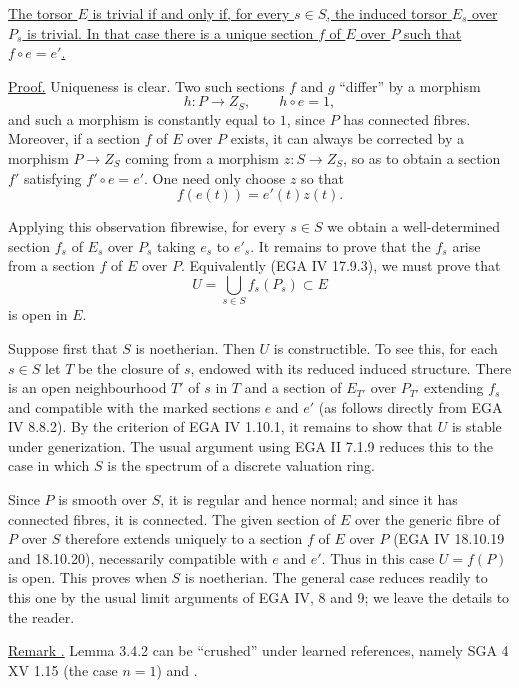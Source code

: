 \underline{The torsor $E$ is trivial if and only if, for every
$s\in S$, the induced torsor $E_s$ over $P_s$ is trivial.  In that
case there is a unique section $f$ of $E$ over $P$ such that
$f\circ e=e'$.}

\noindent\underline{Proof.}  Uniqueness is clear.  Two such sections
$f$ and $g$ ``differ'' by a morphism
\[
 h:P\longrightarrow Z_S,
 \qquad h\circ e=1,
\]
and such a morphism is constantly equal to $1$, since $P$ has
connected fibres.  Moreover, if a section $f$ of $E$ over $P$
exists, it can always be corrected by a morphism
$P\longrightarrow Z_S$ coming from a morphism $z:S\longrightarrow
Z_S$, so as to obtain a section $f'$ satisfying $f'\circ e=e'$.
One need only choose $z$ so that
\[
 f(e(t))=e'(t)z(t).
\]

Applying this observation fibrewise, for every $s\in S$ we obtain a
well-determined section $f_s$ of $E_s$ over $P_s$ taking $e_s$ to
$e'_s$.  It remains to prove that the $f_s$ arise from a section $f$
of $E$ over $P$.  Equivalently (EGA IV 17.9.3), we must prove that
\[
 U=\bigcup_{s\in S}f_s(P_s)\subset E
\]
is open in $E$.

Suppose first that $S$ is noetherian.  Then $U$ is constructible.  To
see this, for each $s\in S$ let $T$ be the closure of $s$, endowed
with its reduced induced structure.  There is an open neighbourhood
$T'$ of $s$ in $T$ and a section of $E_{T'}$ over $P_{T'}$ extending
$f_s$ and compatible with the marked sections $e$ and $e'$ (as
follows directly from EGA IV 8.8.2).  By the criterion of EGA IV
1.10.1, it remains to show that $U$ is stable under generization.
The usual argument using EGA II 7.1.9 reduces this to the case in
which $S$ is the spectrum of a discrete valuation ring.

Since $P$ is smooth over $S$, it is regular and hence normal; and
since it has connected fibres, it is connected.  The given section
of $E$ over the generic fibre of $P$ over $S$ therefore extends
uniquely to a section $f$ of $E$ over $P$ (EGA IV 18.10.19 and
18.10.20), necessarily compatible with $e$ and $e'$.  Thus in this
case $U=f(P)$ is open.  This proves  when $S$ is noetherian.  The
general case reduces readily to this one by the usual limit
arguments of EGA IV, 8 and 9; we leave the details to the reader.

\medskip
\noindent\underline{Remark .}  Lemma 3.4.2 can be ``crushed''
under learned references, namely SGA 4 XV 1.15 (the case $n=1$) and
.

